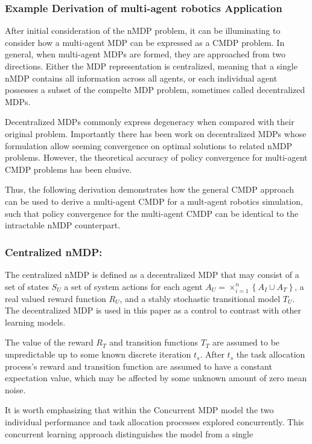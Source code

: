 \documentclass[]{article}
\begin{document}
\subsubsection{Example Derivation of multi-agent robotics
Application}\label{example-derivation-of-multi-agent-robotics-application}

After initial consideration of the nMDP problem, it can be illuminating
to consider how a multi-agent MDP can be expressed as a CMDP problem. In
general, when multi-agent MDPs are formed, they are approached from two
directions. Either the MDP representation is centralized, meaning that a
single nMDP contains all information across all agents, or each
individual agent possesses a subset of the compelte MDP problem,
sometimes called decentralized MDPs.

Decentralized MDPs commonly express degeneracy when compared with their
original problem. Importantly there has been work on decentralized MDPs
whose formulation allow seeming convergence on optimal solutions to
related nMDP problems. However, the theoretical accuracy of policy
convergence for multi-agent CMDP problems has been elusive.

Thus, the following derivation demonstrates how the general CMDP
approach can be used to derive a multi-agent CMDP for a mult-agent
robotics simulation, such that policy convergence for the multi-agent
CMDP can be identical to the intractable nMDP counterpart.

\subsubsection{Centralized nMDP:}\label{centralized-nmdp}

The centralized nMDP is defined as a decentralized MDP that may consist
of a set of states \(S_{U}\) a set of system actions for each agent
\(A_{U} = \times_{i = 1}^{n}\left\{ A_{I} \cup A_{T} \right\}\), a real
valued reward function \(R_{U}\), and a stably stochastic transitional
model \(T_{U}\). The decentralized MDP is used in this paper as a
control to contrast with other learning models.

The value of the reward \(R_{T}\) and transition functions \(T_{T}\) are
assumed to be unpredictable up to some known discrete iteration
\(t_{s}\). After \(t_{s}\) the task allocation process's reward and
transition function are assumed to have a constant expectation value,
which may be affected by some unknown amount of zero mean noise.

It is worth emphasizing that within the Concurrent MDP model the two
individual performance and task allocation processes explored
concurrently. This concurrent learning approach distinguishes the model
from a single
\end{document}
